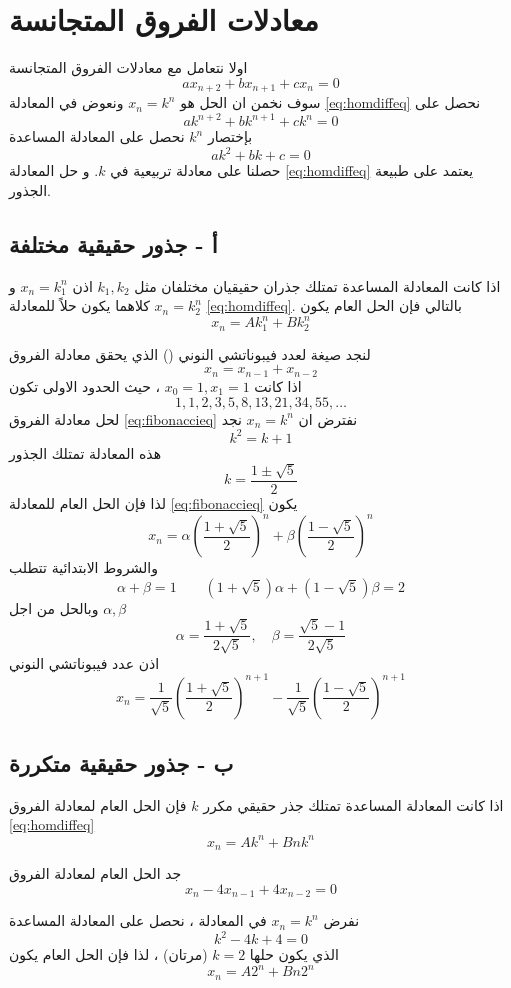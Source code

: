 \section{معادلات الفروق المتجانسة}
اولا نتعامل مع معادلات الفروق المتجانسة
\begin{equation}
	\label{eq:homdiffeq}
	ax_{n+2} + b x_{n+1} + c x_n = 0
\end{equation}
سوف نخمن ان الحل هو $x_n = k^n$ ونعوض في المعادلة \eqref{eq:homdiffeq} نحصل على
\[
a k^{n+2} + b k^{n+1} + ck^n = 0
\]
بإختصار $k^n$ نحصل على المعادلة المساعدة
\[
ak^2 + bk + c = 0
\]
حصلنا على معادلة تربيعية في $k$. و حل المعادلة \eqref{eq:homdiffeq} يعتمد على طبيعة الجذور.

\subsection*{أ - جذور حقيقية مختلفة}
اذا كانت المعادلة المساعدة تمتلك جذران حقيقيان مختلفان مثل $k_1, k_2$ اذن $x_n = k_1^n$ و $x_n = k_2^n$ كلاهما يكون حلاً للمعادلة \eqref{eq:homdiffeq}. بالتالي فإن الحل العام يكون
\[
x_n = A k_1^n + B k_2^n
\]

\begin{example}
	لنجد صيغة لعدد فيبوناتشي النوني 
	()
	الذي يحقق معادلة الفروق
\begin{equation}
	\label{eq:fibonaccieq}
		x_n = x_{n-1} + x_{n-2}
\end{equation}
	اذا كانت $x_0 =1, x_1=1 $ ، حيث الحدود الاولى تكون
	\[
    1, 1, 2, 3 ,5, 8, 13, 21, 34, 55, \dots
    \]
    لحل معادلة الفروق \eqref{eq:fibonaccieq} نفترض ان $x_n = k^n $ نجد
    \[
    k^2 = k+1 
    \]
    هذه المعادلة تمتلك الجذور
    \[
    k = \frac{1\pm \sqrt{5}}{2}
    \]
    لذا فإن الحل العام للمعادلة \eqref{eq:fibonaccieq} يكون
    \[
    x_n = \alpha \left(\frac{1+\sqrt{5}}{2}\right)^n + \beta\left(\frac{1-\sqrt{5}}{2}\right)^n
    \]
    والشروط الابتدائية تتطلب
    \[
    \alpha+ \beta =1\qquad (1+\sqrt{5})\alpha + (1-\sqrt{5})\beta = 2
    \]
    وبالحل من اجل $\alpha, \beta$ 
    \[
    \alpha = \frac{1+\sqrt{5}}{2\sqrt{5}}, \quad \beta = \frac{\sqrt{5}-1}{2\sqrt{5}}
    \]
    اذن عدد فيبوناتشي النوني 
    \[
    x_n = \frac{1}{\sqrt{5}} \left(\frac{1+\sqrt{5}}{2}\right)^{n+1} - \frac{1}{\sqrt{5}} \left(\frac{1-\sqrt{5}}{2}\right)^{n+1}
    \]
\end{example}


\subsection*{ب - جذور حقيقية متكررة}
اذا كانت المعادلة المساعدة تمتلك جذر حقيقي مكرر $k$ فإن الحل العام لمعادلة الفروق \eqref{eq:homdiffeq} 
\[
x_n = Ak^n + Bn k^n
\]
 \newpage
\begin{example}
 جد الحل العام لمعادلة الفروق 
 \[
 x_n - 4x_{n-1} + 4x_{n-2} =0 
 \]

\end{example}
\begin{solution}
	نفرض $x_n = k^n$ في المعادلة ، نحصل على المعادلة المساعدة 
	\[
	k^2 - 4k + 4=0
	\]
	الذي يكون حلها $k=2 $ (مرتان) ، لذا فإن الحل العام يكون
	\[
	x_n = A 2^n + Bn 2^n
	\]
\end{solution}

